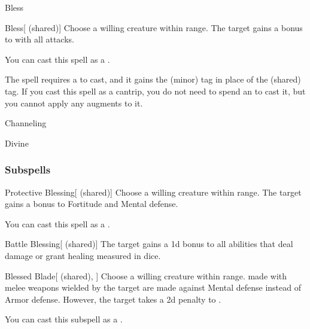 \newpage
\begin{spellsection}{Bless}

\begin{spellheader}
\end{spellheader}


\begin{ability}{Bless}[ (shared)]
Choose a willing creature within \rngclose range.
The target gains a  bonus to  with all attacks.

You can cast this spell as a .
\end{ability}



 The spell requires a  to cast, and it gains the  (minor) tag in place of the  (shared) tag. If you cast this spell as a cantrip,
you do not need to spend an  to cast it,
but you cannot apply any augments to it.


 Channeling

 Divine
\end{spellsection}


\subsubsection{Subspells}


\begin{ability}[\nth{1}]{Protective Blessing}[ (shared)]
Choose a willing creature within \rngclose range.
The target gains a  bonus to Fortitude and Mental defense.

You can cast this spell as a .
\end{ability}
\vspace{0.25em}


\begin{ability}[\nth{3}]{Battle Blessing}[ (shared)]
The target gains a \plus1d bonus to all abilities that deal damage or grant healing measured in dice.
\end{ability}
\vspace{0.25em}


\begin{ability}[\nth{3}]{Blessed Blade}[ (shared), ]
Choose a willing creature within \rngclose range.
 made with melee weapons wielded by the target are made against Mental defense instead of Armor defense.
However, the target takes a \minus2d penalty to .

You can cast this subspell as a .
\end{ability}
\vspace{0.25em}


